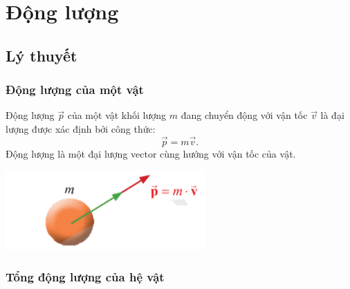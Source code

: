 \let\lesson\undefined
\newcommand{\lesson}{\phantomlesson{Bài 18: Động lượng.}}
\chapter[Động lượng]{Động lượng}
\setcounter{section}{0}
\section{Lý thuyết}
\subsection{Động lượng của một vật}
\begin{minipage}{0.6\textwidth}
	Động lượng $\vec{p}$ của một vật khối lượng $m$ đang chuyển động với vận tốc $\vec{v}$ là đại lượng được xác định bởi công thức:
	\begin{equation*}
		\vec{p}=m\vec{v}.
	\end{equation*}
	Động lượng là một đại lượng vector cùng hướng với vận tốc của vật.
\end{minipage}
\begin{minipage}{0.4\textwidth}
	\begin{center}
		\includegraphics[scale=0.7]{../figs/G10-023-1}
	\end{center}
\end{minipage}

\subsection{Tổng động lượng của hệ vật}
